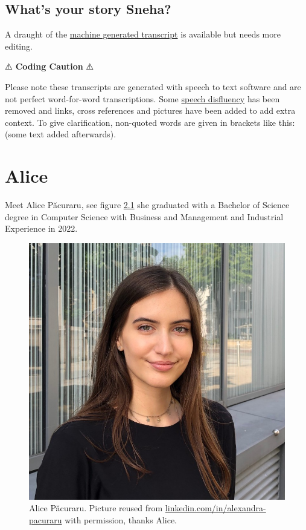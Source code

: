\documentclass[
]{book}
\begin{document}
\hypertarget{sneha-story}{%
\section{What's your story Sneha?}\label{sneha-story}}

A draught of the \href{https://github.com/dullhunk/cdyf/blob/master/26-sneha.md}{machine generated transcript} is available but needs more editing.

⚠️ \textbf{Coding Caution} ⚠️

Please note these transcripts are generated with speech to text software and are not perfect word-for-word transcriptions. Some \href{https://en.wikipedia.org/wiki/Speech_disfluency}{speech disfluency} has been removed and links, cross references and pictures have been added to add extra context. To give clarification, non-quoted words are given in brackets like this: (some text added afterwards).

\hypertarget{alice}{%
\chapter{Alice}\label{alice}}

Meet Alice Păcuraru, see figure \ref{fig:alice-fig} she graduated with a Bachelor of Science degree in Computer Science with Business and Management and Industrial Experience in 2022.

\begin{figure}

{\centering \includegraphics[width=1\linewidth]{images/alice} 

}

\caption{Alice Păcuraru. Picture reused from \href{https://uk.linkedin.com/in/alexandra-pacuraru}{linkedin.com/in/alexandra-pacuraru} with permission, thanks Alice.}\label{fig:alice-fig}
\end{figure}
\end{document}
